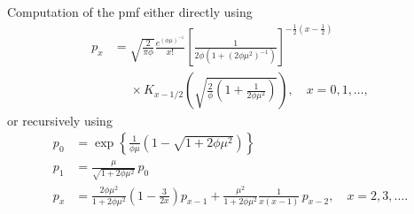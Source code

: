 \documentclass[x11names]{article}
\begin{document}
\noindent%
Computation of the pmf either directly using
\begin{align*}
  p_x &= \sqrt{\frac{2}{\pi \phi}}
  \frac{e^{(\phi\mu)^{-1}}}{x!}
  \left[
    \frac{1}{2\phi (1 + (2\phi\mu^2)^{-1})}
  \right]^{-\frac{1}{2}(x - \frac{1}{2})} \\
  &\phantom{=} \times
  K_{x - 1/2}
  \left(
    \sqrt{\frac{2}{\phi}\left(1 + \frac{1}{2\phi\mu^2}\right)}
  \right), \quad x = 0, 1, \dots,
\end{align*}
or recursively using
\begin{align*}
  p_0 &= \exp\left\{
        \frac{1}{\phi\mu} (1 - \sqrt{1 + 2\phi\mu^2})
        \right\} \\
  p_1 &= \frac{\mu}{\sqrt{1 + 2\phi\mu^2}}\, p_0 \\
  p_x &= \frac{2\phi\mu^2}{1 + 2\phi\mu^2}
        \left( 1 - \frac{3}{2x} \right) p_{x - 1}  + \frac{\mu^2}{1 + 2\phi\mu^2}
        \frac{1}{x(x - 1)}\, p_{x - 2}, \quad x = 2, 3, \dots.
\end{align*}





\end{document}
